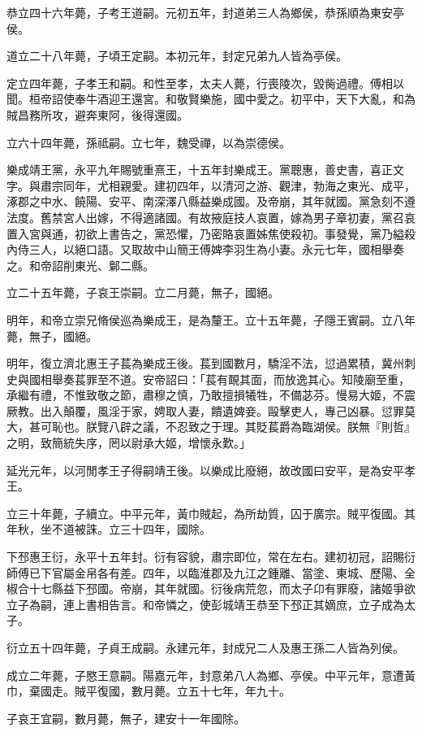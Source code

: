 \begin{pinyinscope}
恭立四十六年薨，子考王道嗣。元初五年，封道弟三人為鄉侯，恭孫順為東安亭侯。

道立二十八年薨，子頃王定嗣。本初元年，封定兄弟九人皆為亭侯。

定立四年薨，子孝王和嗣。和性至孝，太夫人薨，行喪陵次，毀胔過禮。傅相以聞。桓帝詔使奉牛酒迎王還宮。和敬賢樂施，國中愛之。初平中，天下大亂，和為賊昌務所攻，避奔東阿，後得還國。

立六十四年薨，孫祗嗣。立七年，魏受禪，以為崇德侯。

樂成靖王黨，永平九年賜號重熹王，十五年封樂成王。黨聰惠，善史書，喜正文字。與肅宗同年，尤相親愛。建初四年，以清河之游、觀津，勃海之東光、成平，涿郡之中水、饒陽、安平、南深澤八縣益樂成國。及帝崩，其年就國。黨急刻不遵法度。舊禁宮人出嫁，不得適諸國。有故掖庭技人哀置，嫁為男子章初妻，黨召哀置入宮與通，初欲上書告之，黨恐懼，乃密賂哀置姊焦使殺初。事發覺，黨乃縊殺內侍三人，以絕口語。又取故中山簡王傅婢李羽生為小妻。永元七年，國相舉奏之。和帝詔削東光、鄡二縣。

立二十五年薨，子哀王崇嗣。立二月薨，無子，國絕。

明年，和帝立崇兄脩侯巡為樂成王，是為釐王。立十五年薨，子隱王賓嗣。立八年薨，無子，國絕。

明年，復立濟北惠王子萇為樂成王後。萇到國數月，驕淫不法，愆過累積，冀州刺史與國相舉奏萇罪至不道。安帝詔曰：「萇有靦其面，而放逸其心。知陵廟至重，承繼有禮，不惟致敬之節，肅穆之慎，乃敢擅損犧牲，不備苾芬。慢易大姬，不震厥教。出入顛覆，風淫于家，娉取人妻，饋遺婢妾。毆擊吏人，專己凶暴。愆罪莫大，甚可恥也。朕覽八辟之議，不忍致之于理。其貶萇爵為臨湖侯。朕無『則哲』之明，致簡統失序，罔以尉承大姬，增懷永歎。」

延光元年，以河閒孝王子得嗣靖王後。以樂成比廢絕，故改國曰安平，是為安平孝王。

立三十年薨，子續立。中平元年，黃巾賊起，為所劫質，囚于廣宗。賊平復國。其年秋，坐不道被誅。立三十四年，國除。

下邳惠王衍，永平十五年封。衍有容貌，肅宗即位，常在左右。建初初冠，詔賜衍師傅已下官屬金帛各有差。四年，以臨淮郡及九江之鍾離、當塗、東城、歷陽、全椒合十七縣益下邳國。帝崩，其年就國。衍後病荒忽，而太子卬有罪廢，諸姬爭欲立子為嗣，連上書相告言。和帝憐之，使彭城靖王恭至下邳正其嫡庶，立子成為太子。

衍立五十四年薨，子貞王成嗣。永建元年，封成兄二人及惠王孫二人皆為列侯。

成立二年薨，子愍王意嗣。陽嘉元年，封意弟八人為鄉、亭侯。中平元年，意遭黃巾，棄國走。賊平復國，數月薨。立五十七年，年九十。

子哀王宜嗣，數月薨，無子，建安十一年國除。


\end{pinyinscope}
